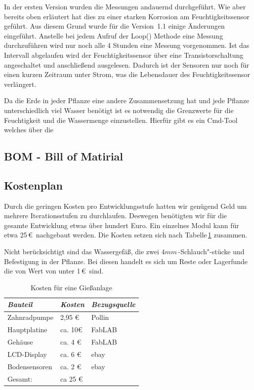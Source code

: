 \documentclass[]{IEEEtran}
\begin{document}
	In der ersten Version wurden die Messungen andauernd durchgeführt. 
	Wie aber bereits oben erläutert hat dies zu einer starken Korrosion am Feuchtigkeitssensor geführt. 
	Aus diesem Grund wurde für die Version~1.1 einige Änderungen eingeführt. 
	Anstelle bei jedem Aufruf der Loop() Methode eine Messung durchzuführen wird nur noch alle 4 Stunden eine Messung vorgenommen. 
	Ist das Intervall abgelaufen wird der Feuchtigkeitssensor über eine Transistorschaltung angeschaltet und anschließend ausgelesen. 
	Dadurch ist der Sensoren nur noch für einen kurzen Zeitraum unter Strom, was die Lebensdauer des Feuchtigkeitssensor verlängert.
		
	
	Da die Erde in jeder Pflanze eine andere Zusammensetzung hat und jede Pflanze unterschiedlich viel Wasser benötigt ist es notwendig die Grenzwerte für die Feuchtigkeit und die Wassermenge einzustellen. 
	Hierfür gibt es ein Cmd-Tool welches über die 
	

	
\subsection{BOM - Bill of Matirial}
	
\subsection{Kostenplan}
 Durch die geringen Kosten pro Entwicklungsstufe hatten wir genügend Geld um mehrere Iterationsstufen  zu durchlaufen.
 Deswegen benötigten wir für die gesamte Entwicklung etwas über hundert Euro.
 Ein einzelnes Modul kann für etwa 25\,\euro\ nachgebaut werden. 
 Die Kosten setzen sich nach Tabelle\,\ref{Kosten für eine Giessanlage} zusammen.
 
 Nicht berücksichtigt sind das Wassergefäß, die zwei \begin{math}4mm\end{math}\,-Schlauch"-stücke und Befestigung in der Pflanze.
 Bei diesen handelt es sich um Reste oder Lagerfunde die von Wert von unter 1\,\euro\ sind. 
 
\begin{table}[h]
	\centering
	\onehalfspacing
	\footnotesize
	\caption{Kosten für eine Gießanlage}
	\label{Kosten für eine Giessanlage}
		\begin{tabular}{|l|ll|}
			\hline
\textit{Bauteil} & \textit{Kosten} & \textit{Bezugsquelle} \\
\hline
Zahnradpumpe & 2,95 \euro & Pollin \\
Hauptplatine & ca. 10\euro & FabLAB \\
Gehäuse	& ca. 4 \euro & FabLAB \\
LCD-Display & ca. 6 \euro & ebay\\
Bodensensoren & ca. 2 \euro & ebay \\
\hline
Gesamt: & ca 25 \euro & \\
\hline
\end{tabular}
\end{table}
\end{document}

